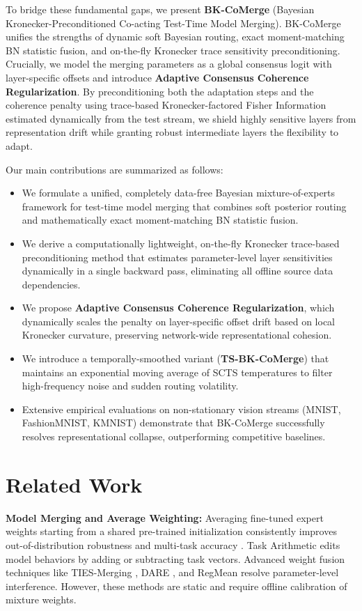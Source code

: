 \documentclass{article}
\theoremstyle{plain}
\theoremstyle{definition}
\theoremstyle{remark}
\begin{document}
To bridge these fundamental gaps, we present \textbf{BK-CoMerge} (Bayesian Kronecker-Preconditioned Co-acting Test-Time Model Merging). BK-CoMerge unifies the strengths of dynamic soft Bayesian routing, exact moment-matching BN statistic fusion, and on-the-fly Kronecker trace sensitivity preconditioning. Crucially, we model the merging parameters as a global consensus logit with layer-specific offsets and introduce \textbf{Adaptive Consensus Coherence Regularization}. By preconditioning both the adaptation steps and the coherence penalty using trace-based Kronecker-factored Fisher Information estimated dynamically from the test stream, we shield highly sensitive layers from representation drift while granting robust intermediate layers the flexibility to adapt.

Our main contributions are summarized as follows:
\begin{itemize}
    \item We formulate a unified, completely data-free Bayesian mixture-of-experts framework for test-time model merging that combines soft posterior routing and mathematically exact moment-matching BN statistic fusion.
    \item We derive a computationally lightweight, on-the-fly Kronecker trace-based preconditioning method that estimates parameter-level layer sensitivities dynamically in a single backward pass, eliminating all offline source data dependencies.
    \item We propose \textbf{Adaptive Consensus Coherence Regularization}, which dynamically scales the penalty on layer-specific offset drift based on local Kronecker curvature, preserving network-wide representational cohesion.
    \item We introduce a temporally-smoothed variant (\textbf{TS-BK-CoMerge}) that maintains an exponential moving average of SCTS temperatures to filter high-frequency noise and sudden routing volatility.
    \item Extensive empirical evaluations on non-stationary vision streams (MNIST, FashionMNIST, KMNIST) demonstrate that BK-CoMerge successfully resolves representational collapse, outperforming competitive baselines.
\end{itemize}

\section{Related Work}
\label{sec:related}
\textbf{Model Merging and Average Weighting:} Averaging fine-tuned expert weights starting from a shared pre-trained initialization consistently improves out-of-distribution robustness and multi-task accuracy \cite{wortsman2022soups}. Task Arithmetic \cite{ilharco2023task} edits model behaviors by adding or subtracting task vectors. Advanced weight fusion techniques like TIES-Merging \cite{yadav2023ties}, DARE \cite{yu2023dare}, and RegMean \cite{jin2023regmean} resolve parameter-level interference. However, these methods are static and require offline calibration of mixture weights.
\end{document}
